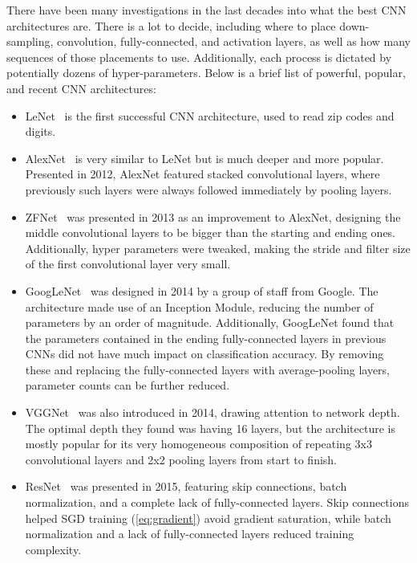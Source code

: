 There have been many investigations in the last decades into what the best CNN architectures are. There is a lot to decide, including where to place down-sampling, convolution, fully-connected, and activation layers, as well as how many sequences of those placements to use. Additionally, each process is dictated by potentially dozens of hyper-parameters. Below is a brief list of powerful, popular, and recent CNN architectures:
\begin{itemize}
\item LeNet~\cite{lenet} is the first successful CNN architecture, used to read zip codes and digits.
\item AlexNet~\cite{imagenet} is very similar to LeNet but is much deeper and more popular. Presented in 2012, AlexNet featured stacked convolutional layers, where previously such layers were always followed immediately by pooling layers.
\item ZFNet~\cite{zfnet} was presented in 2013 as an improvement to AlexNet, designing the middle convolutional layers to be bigger than the starting and ending ones. Additionally, hyper parameters were tweaked, making the stride and filter size of the first convolutional layer very small.
\item GoogLeNet~\cite{googlenet} was designed in 2014 by a group of staff from Google. The architecture made use of an Inception Module, reducing the number of parameters by an order of magnitude. Additionally, GoogLeNet found that the parameters contained in the ending fully-connected layers in previous CNNs did not have much impact on classification accuracy. By removing these and replacing the fully-connected layers with average-pooling layers, parameter counts can be further reduced.
\item VGGNet~\cite{vggnet} was also introduced in 2014, drawing attention to network depth. The optimal depth they found was having 16 layers, but the architecture is mostly popular for its very homogeneous composition of repeating 3x3 convolutional layers and 2x2 pooling layers from start to finish.
\item ResNet~\cite{resnet} was presented in 2015, featuring skip connections, batch normalization, and a complete lack of fully-connected layers. Skip connections helped SGD training (\ref{eq:gradient}) avoid gradient saturation, while batch normalization and a lack of fully-connected layers reduced training complexity.
\end{itemize}

